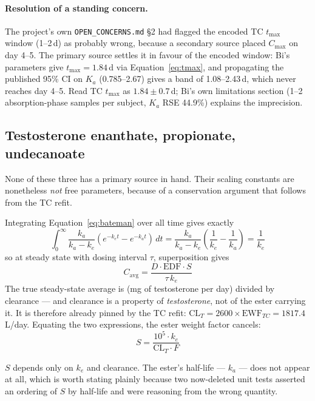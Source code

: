 \documentclass[11pt,a4paper]{article}
\newcommand{\code}[1]{\texttt{\small #1}}
\begin{document}
\paragraph{Resolution of a standing concern.} The project's own
\code{OPEN\_CONCERNS.md} \S2 had flagged the encoded TC $t_{\max}$ window
(1--2\,d) as probably wrong, because a secondary source placed $C_{\max}$ on day
4--5. The primary source settles it in favour of the encoded window: Bi's
parameters give $t_{\max} = 1.84$\,d via Equation~\ref{eq:tmax}, and propagating
the published 95\% CI on $K_a$ (0.785--2.67) gives a band of 1.08--2.43\,d, which
never reaches day 4--5. Read TC $t_{\max}$ as $1.84 \pm 0.7$\,d; Bi's own
limitations section (1--2 absorption-phase samples per subject, $K_a$
RSE 44.9\%) explains the imprecision.

\subsection{Testosterone enanthate, propionate, undecanoate}
\label{sec:identity}

None of these three has a primary source in hand. Their scaling constants are
nonetheless \emph{not} free parameters, because of a conservation argument that
follows from the TC refit.

Integrating Equation~\ref{eq:bateman} over all time gives exactly
\[
\int_0^{\infty} \frac{k_a}{k_a-k_e}\left(e^{-k_e t}-e^{-k_a t}\right)\,dt
= \frac{k_a}{k_a-k_e}\left(\frac{1}{k_e}-\frac{1}{k_a}\right) = \frac{1}{k_e}
\]
so at steady state with dosing interval $\tau$, superposition gives
\begin{equation}
C_{\mathrm{avg}} = \frac{D \cdot \mathrm{EDF} \cdot S}{\tau \, k_e}
\label{eq:cavgmodel}
\end{equation}
The true steady-state average is (mg of testosterone per day) divided by
clearance --- and clearance is a property of \emph{testosterone}, not of the ester
carrying it. It is therefore already pinned by the TC refit:
$\mathrm{CL}_T = 2600 \times \mathrm{EWF}_{TC} = 1817.4$\,L/day. Equating the two
expressions, the ester weight factor cancels:
\begin{equation}
\boxed{\;S = \frac{10^5 \cdot k_e}{\mathrm{CL}_T \cdot F}\;}
\label{eq:identity}
\end{equation}

$S$ depends only on $k_e$ and clearance. The ester's half-life --- $k_a$ --- does
not appear at all, which is worth stating plainly because two now-deleted unit
tests asserted an ordering of $S$ by half-life and were reasoning from the wrong
quantity.
\end{document}
